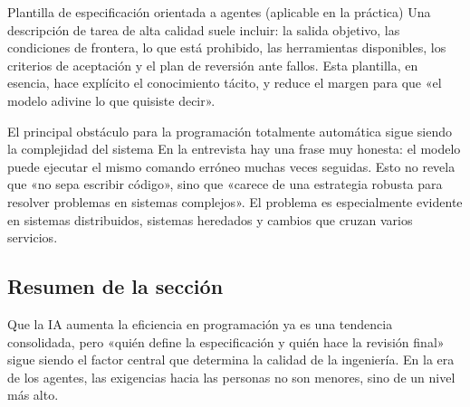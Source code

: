 \begin{knowledgebox}{Plantilla de especificación orientada a agentes (aplicable en la práctica)}
Una descripción de tarea de alta calidad suele incluir: la salida objetivo, las condiciones de frontera, lo que está prohibido, las herramientas disponibles, los criterios de aceptación y el plan de reversión ante fallos. Esta plantilla, en esencia, hace explícito el conocimiento tácito, y reduce el margen para que «el modelo adivine lo que quisiste decir».
\end{knowledgebox}

\begin{warningbox}{El principal obstáculo para la programación totalmente automática sigue siendo la complejidad del sistema}
En la entrevista hay una frase muy honesta: el modelo puede ejecutar el mismo comando erróneo muchas veces seguidas. Esto no revela que «no sepa escribir código», sino que «carece de una estrategia robusta para resolver problemas en sistemas complejos». El problema es especialmente evidente en sistemas distribuidos, sistemas heredados y cambios que cruzan varios servicios.
\end{warningbox}

\subsection{Resumen de la sección}

Que la IA aumenta la eficiencia en programación ya es una tendencia consolidada, pero «quién define la especificación y quién hace la revisión final» sigue siendo el factor central que determina la calidad de la ingeniería. En la era de los agentes, las exigencias hacia las personas no son menores, sino de un nivel más alto.

